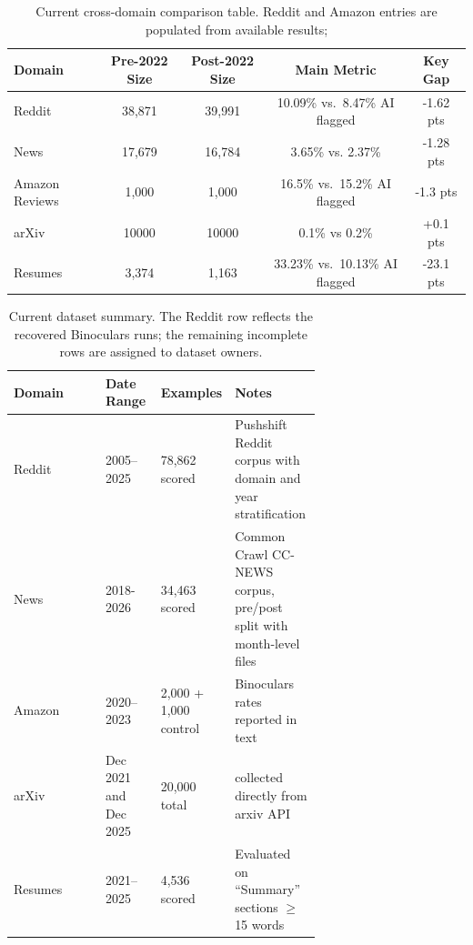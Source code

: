 \documentclass[11pt]{article}
\begin{document}
\begin{table}[t]
    \centering
    \small
    \begin{tabular}{lcccc}
        \toprule
        Domain & Pre-2022 Size & Post-2022 Size & Main Metric & Key Gap \\
        \midrule
        Reddit & 38,871 & 39,991 & 10.09\% vs.\ 8.47\% AI flagged & -1.62 pts \\
        News & 17,679 & 16,784 & 3.65\% vs. 2.37\% & -1.28 pts \\
        Amazon Reviews & 1,000 & 1,000 & 16.5\% vs.\ 15.2\% AI flagged & -1.3 pts \\
        arXiv & 10000 & 10000 & 0.1\% vs 0.2\% & +0.1 pts\\
        Resumes & 3,374 & 1,163 & 33.23\% vs.\ 10.13\% AI flagged & -23.1 pts \\
        \bottomrule
    \end{tabular}
    \caption{Current cross-domain comparison table. Reddit and Amazon entries
    are populated from available results; }
    \label{tab:main-results}
\end{table}

\begin{table}[t]
    \centering
    \small
    \setlength{\tabcolsep}{4pt}
    \begin{tabular}{lp{0.18\linewidth}p{0.21\linewidth}p{0.28\linewidth}}
        \toprule
        Domain & Date Range & Examples & Notes \\
        \midrule
        Reddit & 2005--2025 & 78,862 scored & Pushshift Reddit corpus with domain and year stratification \\
        News & 2018-2026 & 34,463 scored & Common Crawl CC-NEWS corpus, pre/post split with month-level files \\
        Amazon & 2020--2023 & 2,000 + 1,000 control & Binoculars rates reported in text \\
        arXiv & Dec 2021 and Dec 2025 & 20,000 total & collected directly from arxiv API \\
        Resumes & 2021--2025 & 4,536 scored & Evaluated on ``Summary'' sections $\ge$ 15 words \\
        \bottomrule
    \end{tabular}
    \caption{Current dataset summary. The Reddit row reflects the recovered
    Binoculars runs; the remaining incomplete rows are assigned to dataset
    owners.}
    \label{tab:data-summary}
\end{table}
\end{document}
